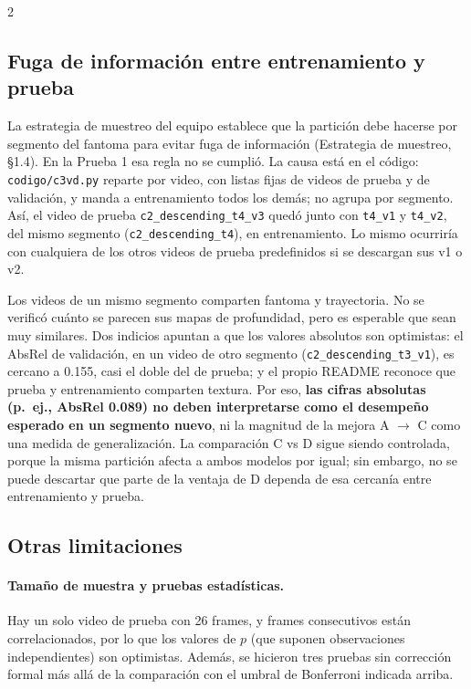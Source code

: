 \documentclass[11pt,letterpaper]{article}
\begin{document}
\begin{multicols}{2}
\subsection{Fuga de información entre entrenamiento y prueba}
\label{sec:fuga}

La estrategia de muestreo del equipo establece que la partición debe hacerse por segmento del fantoma para evitar fuga de información (Estrategia de muestreo, \S1.4). En la Prueba 1 esa regla no se cumplió. La causa está en el código: \texttt{codigo/c3vd.py} reparte por video, con listas fijas de videos de prueba y de validación, y manda a entrenamiento todos los demás; no agrupa por segmento. Así, el video de prueba \texttt{c2\_\allowbreak descending\_\allowbreak t4\_\allowbreak v3} quedó junto con \texttt{t4\_\allowbreak v1} y \texttt{t4\_\allowbreak v2}, del mismo segmento (\texttt{c2\_\allowbreak descending\_\allowbreak t4}), en entrenamiento. Lo mismo ocurriría con cualquiera de los otros videos de prueba predefinidos si se descargan sus v1 o v2.

Los videos de un mismo segmento comparten fantoma y trayectoria. No se verificó cuánto se parecen sus mapas de profundidad, pero es esperable que sean muy similares. Dos indicios apuntan a que los valores absolutos son optimistas: el AbsRel de validación, en un video de otro segmento (\texttt{c2\_\allowbreak descending\_\allowbreak t3\_\allowbreak v1}), es cercano a 0.155, casi el doble del de prueba; y el propio README reconoce que prueba y entrenamiento comparten textura. Por eso, \textbf{las cifras absolutas (p.~ej., AbsRel 0.089) no deben interpretarse como el desempeño esperado en un segmento nuevo}, ni la magnitud de la mejora A $\to$ C como una medida de generalización. La comparación C vs D sigue siendo controlada, porque la misma partición afecta a ambos modelos por igual; sin embargo, no se puede descartar que parte de la ventaja de D dependa de esa cercanía entre entrenamiento y prueba.

\subsection{Otras limitaciones}

\paragraph{Tamaño de muestra y pruebas estadísticas.} Hay un solo video de prueba con 26 frames, y frames consecutivos están correlacionados, por lo que los valores de $p$ (que suponen observaciones independientes) son optimistas. Además, se hicieron tres pruebas sin corrección formal más allá de la comparación con el umbral de Bonferroni indicada arriba.


\end{multicols}
\end{document}
